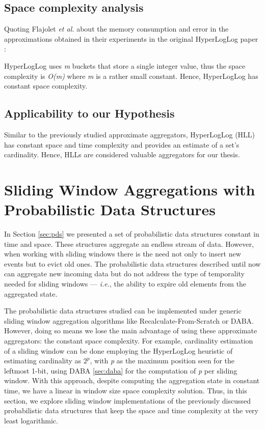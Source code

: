 \subsection*{Space complexity analysis}
Quoting Flajolet \emph{et al.} about the memory consumption and error in the approximations obtained in their experiments in the original HyperLogLog paper \cite{Flajolet-HLL}: 

HyperLogLog uses \textit{m} buckets that store a single integer value, thus the space complexity is \textit{O(m)} where \textit{m} is a rather small constant. Hence, HyperLogLog has constant space complexity.

\subsection*{Applicability to our Hypothesis}
Similar to the previously studied approximate aggregators, HyperLogLog (HLL) has constant space and time complexity and provides an estimate of a set's cardinality. Hence, HLLs are considered valuable aggregators for our thesis.

\section{Sliding Window Aggregations with Probabilistic Data Structures} \label{sec:sliding-pds}
In Section \ref{sec:pds} we presented a set of probabilistic data structures constant in time and space. These structures aggregate an endless stream of data. However, when working with sliding windows there is the need not only to insert new events but to evict old ones. The probabilistic data structures described until now can aggregate new incoming data but do not address the type of temporality needed for sliding windows --- \textit{i.e.}, the ability to expire old elements from the aggregated state.

The probabilistic data structures studied can be implemented under generic sliding window aggregation algorithms like Recalculate-From-Scratch or DABA. However, doing so means we lose the main advantage of using these approximate aggregators: the constant space complexity. For example, cardinality estimation of a sliding window can be done employing the HyperLogLog heuristic of estimating cardinality as $2^\textit{p}$, with \textit{p} as the maximum position seen for the leftmost 1-bit, using DABA \ref{sec:daba} for the computation of \textit{p} per sliding window. With this approach, despite computing the aggregation state in constant time, we have a linear in window size space complexity solution. Thus, in this section, we explore sliding window implementations of the previously discussed probabilistic data structures that keep the space and time complexity at the very least logarithmic.

